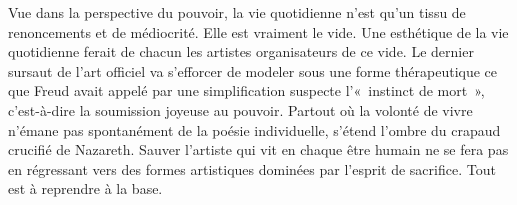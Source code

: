 \documentclass[french,twoside]{book} %
\newcommand{\astermono}{\medskip\centerline{\color{rubric}\large\selectfont{\syms ✻}}\medskip\par}%
\begin{document}
Vue dans la perspective du pouvoir, la vie quotidienne n’est qu’un tissu de renoncements et de médiocrité. Elle est vraiment le vide. Une esthétique de la vie quotidienne ferait de chacun les artistes organisateurs de ce vide. Le dernier sursaut de l’art officiel va s’efforcer de modeler sous une forme thérapeutique ce que Freud avait appelé par une simplification suspecte l’« instinct de mort », c’est-à-dire la soumission joyeuse au pouvoir. Partout où la volonté de vivre n’émane pas spontanément de la poésie individuelle, s’étend l’ombre du crapaud crucifié de Nazareth. Sauver l’artiste qui vit en chaque être humain ne se fera pas en régressant vers des formes artistiques dominées par l’esprit de sacrifice. Tout est à reprendre à la base.\par

\astermono
\end{document}
